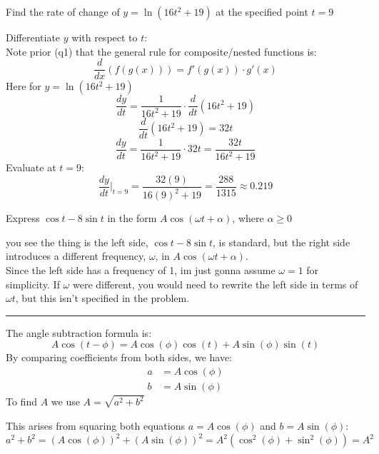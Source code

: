 \documentclass[a4paper, 12pt]{report}
\begin{document}
    \newpage    
    \begin{tcolorbox}[title=\color{black}{\section{Q3}}, colback=white, colframe=black!30!white, boxrule=0.4mm, width=1\textwidth]
        Find the rate of change of \( y=\ln \left(16 t^{2}+19\right) \) at the specified point \( t=9 \)
    \end{tcolorbox}
        
    Differentiate \( y \) with respect to \( t \):\\[1em]
    Note prior (q1) that the general rule for composite/nested functions is:
    \[\frac{d}{dx}(f(g(x))) = f'(g(x))\cdot g'(x)\]
    Here for $y=\ln \left(16 t^{2}+19\right)$
    \[\frac{dy}{dt} = \frac{1}{16t^2 + 19} \cdot \frac{d}{dt}(16t^2 + 19)\]
    \[\frac{d}{dt}(16t^2 + 19) = 32t\]
    \[\frac{dy}{dt} = \frac{1}{16t^2 + 19} \cdot 32t = \frac{32t}{16t^2 + 19}\]
    Evaluate at \( t = 9 \):
    \[\boxed{\frac{dy}{dt} \bigg|_{t=9} = \frac{32 (9)}{16(9)^2 + 19} = \frac{288}{1315} \approx 0.219}\]
    
    \newpage
    \begin{tcolorbox}[title=\color{black}{\section{Q4}}, colback=white, colframe=black!30!white, boxrule=0.4mm, width=1\textwidth]
        Express \( \cos t-8 \sin t \) in the form \( A \cos (\omega t+\alpha) \), where \( \alpha \geq 0 \)
    \end{tcolorbox}
    you see the thing is the left side, \( \cos t - 8 \sin t \), is standard, but the right side introduces a different frequency, \( \omega \), in \( A \cos (\omega t + \alpha) \).\\[10pt]
    Since the left side has a frequency of 1, im just gonna assume \( \omega = 1 \) for simplicity. If \( \omega \) were different, you would need to rewrite the left side in terms of \( \omega t \), but this isn't specified in the problem.\\
    \vspace{0.5em}\hrule\vspace{0.5em}
    The angle subtraction formula is:
    \[A \cos(t - \phi) = A \cos(\phi) \cos(t) + A \sin(\phi) \sin(t)\]
    By comparing coefficients from both sides, we have:
    \begin{align*}
        a & = A \cos(\phi) \\
        b & = A \sin(\phi)
    \end{align*}
    To find $A$ we use $A = \sqrt{a^2 + b^2}$\\
    \vspace*{1em}
    \begin{minipage}{0.45\textwidth}\centering
        This arises from squaring both equations \(a = A \cos(\phi)\) and \(b = A \sin(\phi)\):\\[1em]
        $a^2 + b^2 = (A \cos(\phi))^2 + (A \sin(\phi))^2 = A^2 (\cos^2(\phi) + \sin^2(\phi)) = A^2$
    \end{minipage}\\
    
\end{document}
